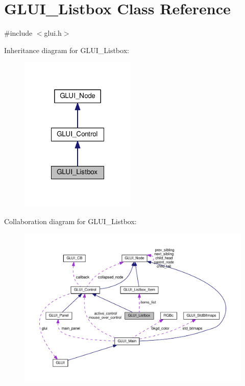 \hypertarget{class_g_l_u_i___listbox}{\section{G\+L\+U\+I\+\_\+\+Listbox Class Reference}
\label{class_g_l_u_i___listbox}
}


{\ttfamily \#include $<$glui.\+h$>$}



Inheritance diagram for G\+L\+U\+I\+\_\+\+Listbox\+:\nopagebreak
\begin{figure}[H]
\begin{center}
\leavevmode
\includegraphics[width=156pt]{class_g_l_u_i___listbox__inherit__graph}
\end{center}
\end{figure}


Collaboration diagram for G\+L\+U\+I\+\_\+\+Listbox\+:\nopagebreak
\begin{figure}[H]
\begin{center}
\leavevmode
\includegraphics[width=350pt]{class_g_l_u_i___listbox__coll__graph}
\end{center}
\end{figure}
